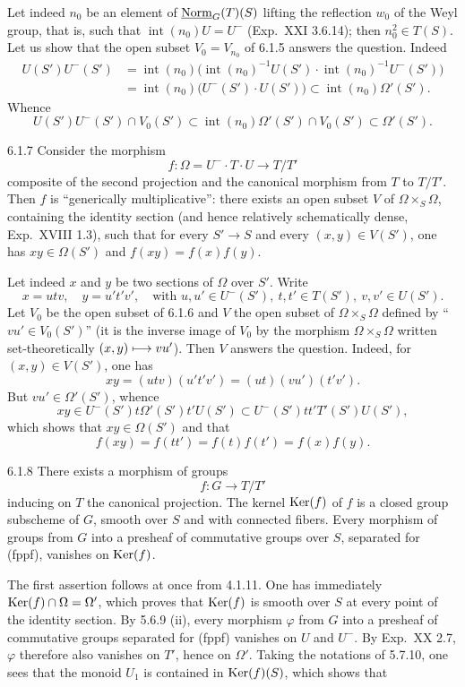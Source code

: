 Let indeed $n_0$ be an element of $\underline{\mathrm{Norm}}_G(T)(S)$ lifting the reflection $w_0$ of the Weyl group,{\renewcommand{\thefootnote}{(60)}} that is, such that $\operatorname{int}(n_0)U=U^-$ (\cf Exp.~XXI 3.6.14); then $n_0^2\in T(S)$. Let us show that the open subset $V_0=V_{n_0}$ of 6.1.5 answers the question. Indeed
\[
\begin{aligned}
U(S')U^-(S')&=\operatorname{int}(n_0)\bigl(\operatorname{int}(n_0)^{-1}U(S')\cdot\operatorname{int}(n_0)^{-1}U^-(S')\bigr)\\
&=\operatorname{int}(n_0)\bigl(U^-(S')\cdot U(S')\bigr)\subset\operatorname{int}(n_0)\Omega'(S').
\end{aligned}
\]
Whence
\[
U(S')U^-(S')\cap V_0(S')\subset\operatorname{int}(n_0)\Omega'(S')\cap V_0(S')\subset\Omega'(S').
\]
\begin{lemma}{6.1.7}\label{XXII.6.1.7}
Consider the morphism
\[
f:\Omega=U^-\cdot T\cdot U\to T/T'
\]
composite of the second projection and the canonical morphism from $T$ to $T/T'$. Then $f$ is ``generically multiplicative'': there exists an open subset $V$ of $\Omega\times_S\Omega$, containing the identity section (and hence relatively schematically dense, Exp.~XVIII 1.3), such that for every $S'\to S$ and every $(x,y)\in V(S')$, one has $xy\in\Omega(S')$ and $f(xy)=f(x)f(y)$.
\end{lemma}
Let indeed $x$ and $y$ be two sections of $\Omega$ over $S'$. Write
\[
x=utv,\quad y=u't'v',\quad\text{with }u,u'\in U^-(S'),\ t,t'\in T(S'),\ v,v'\in U(S').
\]
Let $V_0$ be the open subset of 6.1.6 and $V$ the open subset of $\Omega\times_S\Omega$ defined by ``$vu'\in V_0(S')$'' (it is the inverse image of $V_0$ by the morphism $\Omega\times_S\Omega$ written set-theoretically $(x,y)\longmapsto vu'$). Then $V$ answers the question. Indeed, for $(x,y)\in V(S')$, one has
\[
xy=(utv)(u't'v')=(ut)(vu')(t'v').
\]
But $vu'\in\Omega'(S')$, whence
\[
xy\in U^-(S')t\Omega'(S')t'U(S')\subset U^-(S')tt'T'(S')U(S'),
\]
which shows that $xy\in\Omega(S')$ and that
\[
f(xy)=f(tt')=f(t)f(t')=f(x)f(y).
\]
\begin{proposition}{6.1.8}\label{XXII.6.1.8}
There exists a morphism of groups
\[
f:G\to T/T'
\]
inducing on $T$ the canonical projection. The kernel $\operatorname{Ker}(f)$ of $f$ is a closed group subscheme of $G$, smooth over $S$ and with connected fibers. Every morphism of groups from $G$ into a presheaf of commutative groups over $S$, separated for (fppf), vanishes on $\operatorname{Ker}(f)$.
\end{proposition}
The first assertion follows at once from 4.1.11. One has immediately $\operatorname{Ker}(f)\cap\Omega=\Omega'$, which proves that $\operatorname{Ker}(f)$ is smooth over $S$ at every point of the identity section.{\renewcommand{\thefootnote}{(61)}} By 5.6.9 (ii), every morphism $\varphi$ from $G$ into a presheaf of commutative groups separated for (fppf) vanishes on $U$ and $U^-$. By Exp.~XX 2.7, $\varphi$ therefore also vanishes on $T'$, hence on $\Omega'$. Taking the notations of 5.7.10, one sees that the monoid $U_1$ is contained in $\operatorname{Ker}(f)(S)$, which shows that
